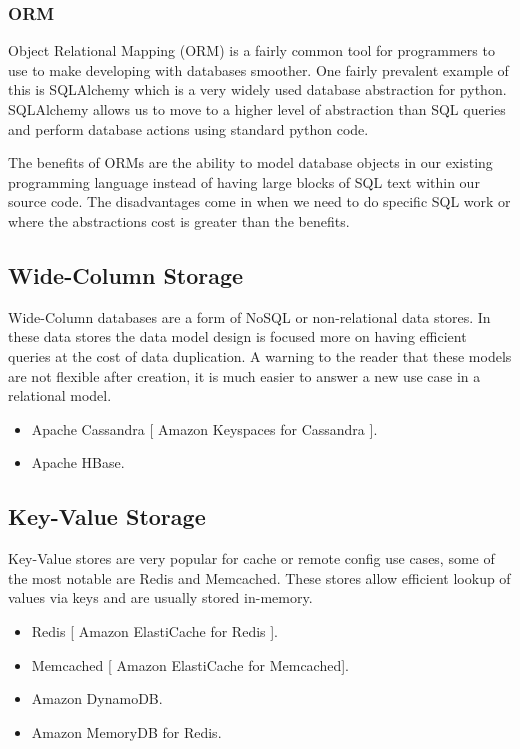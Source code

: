 \documentclass{csse4400}
\begin{document}
  \subsubsection{ORM}
  Object Relational Mapping (ORM) is a fairly common tool for programmers to use to make developing with databases smoother.
  One fairly prevalent example of this is SQLAlchemy which is a very widely used 
  database abstraction for python.
  SQLAlchemy allows us to move to a higher level of abstraction than SQL queries and perform database actions using standard python code.

  The benefits of ORMs are the ability to model database objects in our existing programming language instead of having large blocks of SQL text within our source code.
  The disadvantages come in when we need to do specific SQL work or where the abstractions cost is greater than the benefits.

\subsection{Wide-Column Storage}


Wide-Column databases are a form of NoSQL or non-relational data stores.
In these data stores the data model design 
is focused more on having efficient queries at the cost of data duplication.
A warning to the reader that these models
are not flexible after creation, it is much easier to answer a new use case in a relational model.

  \begin{itemize}
    \item Apache Cassandra [ Amazon Keyspaces for Cassandra ].
    \item Apache HBase.
  \end{itemize}

\subsection{Key-Value Storage}

Key-Value stores are very popular for cache or remote config use cases, some of the most notable are Redis and Memcached.
These stores allow efficient lookup of values via keys and are usually stored in-memory.

\begin{itemize}
  \item Redis [ Amazon ElastiCache for Redis ].
  \item Memcached [ Amazon ElastiCache for Memcached].
  \item Amazon DynamoDB.
  \item Amazon MemoryDB for Redis.
\end{itemize}
\end{document}
